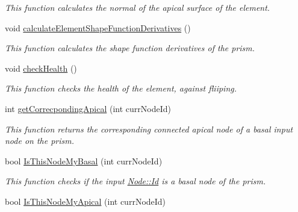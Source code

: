 \begin{DoxyCompactItemize}
\begin{DoxyCompactList}\small\item\em This function calculates the normal of the apical surface of the element. \end{DoxyCompactList}\item 
void \hyperlink{classPrism_a9a877cebf651015b88af641f1e045699}{calculate\+Element\+Shape\+Function\+Derivatives} ()
\begin{DoxyCompactList}\small\item\em This function calculates the shape function derivatives of the prism. \end{DoxyCompactList}\item 
\hypertarget{classPrism_af4ce210a9ba20d34b4b903e936b9dd8d}{}void \hyperlink{classPrism_af4ce210a9ba20d34b4b903e936b9dd8d}{check\+Health} ()\label{classPrism_af4ce210a9ba20d34b4b903e936b9dd8d}

\begin{DoxyCompactList}\small\item\em This function checks the health of the element, against fliiping. \end{DoxyCompactList}\item 
\hypertarget{classPrism_a10377e0ad0ae454a3cd25b82709119ac}{}int \hyperlink{classPrism_a10377e0ad0ae454a3cd25b82709119ac}{get\+Correcponding\+Apical} (int curr\+Node\+Id)\label{classPrism_a10377e0ad0ae454a3cd25b82709119ac}

\begin{DoxyCompactList}\small\item\em This function returns the corresponding connected apical node of a basal input node on the prism. \end{DoxyCompactList}\item 
\hypertarget{classPrism_abe648c5fa60635a50c14186135bed332}{}bool \hyperlink{classPrism_abe648c5fa60635a50c14186135bed332}{Is\+This\+Node\+My\+Basal} (int curr\+Node\+Id)\label{classPrism_abe648c5fa60635a50c14186135bed332}

\begin{DoxyCompactList}\small\item\em This function checks if the input \hyperlink{classNode_a1bd379569cc1a8b96432e61971aed4d9}{Node\+::\+Id} is a basal node of the prism. \end{DoxyCompactList}\item 
\hypertarget{classPrism_ab9f3b638a4068180a11add5921870230}{}bool \hyperlink{classPrism_ab9f3b638a4068180a11add5921870230}{Is\+This\+Node\+My\+Apical} (int curr\+Node\+Id)\label{classPrism_ab9f3b638a4068180a11add5921870230}


\end{DoxyCompactItemize}
